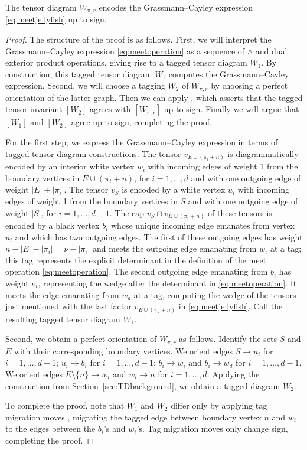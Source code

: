 \documentclass[ALCO, Unicode]{cedram}
\numberwithin{equation}{section}
\begin{document}
\begin{proposition}\label{prop:webs_are_tensors}
The tensor diagram $W_{\pi,r}$ encodes the Grassmann--Cayley expression \eqref{eq:meetjellyfish} up to sign.
\end{proposition}

\begin{proof}
The structure of the proof is as follows. First, we will interpret the Grassmann--Cayley expression \eqref{eq:meetoperation} as a sequence of $\wedge$ and dual exterior product operations, giving rise to a tagged tensor diagram $W_1$. By construction, this tagged tensor diagram $W_1$ computes the Grassmann--Cayley expression. Second, we will choose a tagging $W_2$ of $W_{\pi,r}$ by choosing a perfect orientation of the latter graph. Then we can apply \cite[Lemma 5.4]{Fraser.Lam.Le}, which asserts that the tagged tensor invariant $[W_2]$ agrees with $[W_{\pi,r}]$ up to sign.  Finally we will argue that $[W_1]$ and $[W_2]$ agree up to sign, completing the proof. 

For the first step, we express the Grassmann--Cayley expression in terms of tagged tensor diagram constructions. The tensor $v_{E\cup (\pi_i+n)}$ is diagrammatically encoded by an interior white vertex $w_i$ with incoming edges of weight 1 from the boundary vertices in $E \cup (\pi_i+n)$, for $i=1,\dots,d$ and with one outgoing edge of weight $|E|+|\pi_i|$. The tensor $v_S$ is encoded by a white vertex $u_i$ with incoming edges of weight 1 from the boundary vertices in $S$ and with one outgoing edge of weight $|S|$, for $i=1,\dots,d-1$. The cap $v_S \cap v_{E\cup (\pi_i+n)}$ of these tensors is encoded by a black vertex $b_i$ whose unique incoming edge emanates from vertex $u_i$ and which has two outgoing edges. The first of these outgoing edges has weight $n-|E| - |\pi_i| = \nu-|\pi_i|$ and meets the outgoing edge emanating from $w_i$ at a tag; this tag represents the explicit determinant in the definition of the meet operation \eqref{eq:meetoperation}. The second outgoing edge emanating from $b_i$ has weight $\nu_i$, representing the wedge after the determinant in  \eqref{eq:meetoperation}. It meets the edge emanating from $w_d$ at a tag, computing the wedge of the tensors just mentioned with the last factor $v_{E \cup (\pi_d+n)}$ in \eqref{eq:meetjellyfish}. Call the resulting tagged tensor diagram $W_1$. 

Second, we obtain a perfect orientation of $W_{\pi,r}$ as follows. Identify the sets $S$ and $E$ with their corresponding boundary vertices. We orient edges $S \to u_i$ for $i=1,\dots,d-1$; $u_i \to b_i$ for $i=1,\dots,d-1$; $b_i \to w_i$ and $b_i \to w_d$ for $i=1,\dots,d-1$. We orient edges $E \setminus \{n\} \to w_i$ and $w_i \to n$ for $i=1,\dots,d$. Applying the construction from Section~\ref{sec:TDbackground}, we obtain a tagged diagram $W_2$. 

To complete the proof, note that $W_1$ and $W_2$ differ only by applying tag migration moves \cite[Equation 2.7]{Cautis.Kamnitzer.Morrison}, migrating the tagged edge between boundary vertex $n$ and $w_i$ to the edges between the $b_i$'s and $w_i$'s. Tag migration moves only change sign, completing the proof.
\end{proof}
\end{document}
